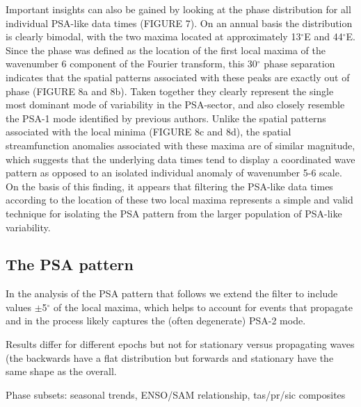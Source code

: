 Important insights can also be gained by looking at the phase distribution for all individual PSA-like data times (FIGURE 7). On an annual basis the distribution is clearly bimodal, with the two maxima located at approximately 13$^{\circ}$E and 44$^{\circ}$E. Since the phase was defined as the location of the first local maxima of the wavenumber 6 component of the Fourier transform, this 30$^{\circ}$ phase separation indicates that the spatial patterns associated with these peaks are exactly out of phase (FIGURE 8a and 8b). Taken together they clearly represent the single most dominant mode of variability in the PSA-sector, and also closely resemble the PSA-1 mode identified by previous authors. Unlike the spatial patterns associated with the local minima (FIGURE 8c and 8d), the spatial streamfunction anomalies associated with these maxima are of similar magnitude, which suggests that the underlying data times tend to display a coordinated wave pattern as opposed to an isolated individual anomaly of wavenumber 5-6 scale. On the basis of this finding, it appears that filtering the PSA-like data times according to the location of these two local maxima represents a simple and valid technique for isolating the PSA pattern from the larger population of PSA-like variability. 

\subsection{The PSA pattern}


In the analysis of the PSA pattern that follows we extend the filter to include values $\pm$5$^{\circ}$ of the local maxima, which helps to account for events that propagate and in the process likely captures the (often degenerate) PSA-2 mode. 

Results differ for different epochs but not for stationary versus propagating waves (the backwards have a flat distribution but forwards and stationary have the same shape as the overall.

Phase subsets: seasonal trends, ENSO/SAM relationship, tas/pr/sic composites







